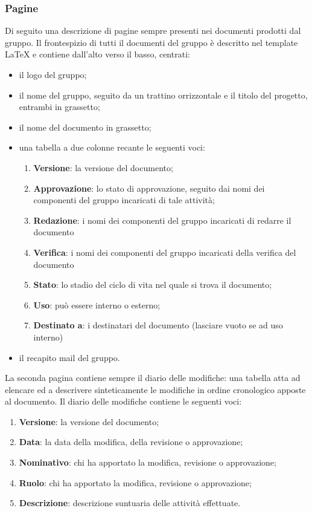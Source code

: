 	    \subsubsection{Pagine}
	    Di seguito una descrizione di pagine sempre presenti nei documenti prodotti dal gruppo.
	    Il frontespizio di tutti il documenti del gruppo è descritto nel template LaTeX e contiene dall'alto verso il basso, centrati:
	    \begin{itemize}
	        \item il logo del gruppo;
	        \item il nome del gruppo, seguito da un trattino orrizzontale e il titolo del progetto, entrambi in grassetto;
	        \item il nome del documento in grassetto;
	        \item una tabella a due colonne recante le seguenti voci:
	        \begin{enumerate}
	            \item \textbf{Versione}: la versione del documento;
	            \item \textbf{Approvazione}: lo stato di approvazione, seguito dai nomi dei componenti del gruppo incaricati di tale attività;
	            \item \textbf{Redazione}: i nomi dei componenti del gruppo incaricati di redarre il documento
	            \item \textbf{Verifica}: i nomi dei componenti del gruppo incaricati della verifica del documento
	            \item \textbf{Stato}: lo stadio del ciclo di vita nel quale si trova il documento;
	            \item \textbf{Uso}: può essere interno o esterno;
	            \item \textbf{Destinato a}: i destinatari del documento (lasciare vuoto se ad uso interno)
	        \end{enumerate}
	        \item il recapito mail del gruppo.
	    \end{itemize}
	    
	    La seconda pagina contiene sempre il diario delle modifiche: una tabella atta ad elencare ed a descrivere sinteticamente le modifiche in ordine cronologico apposte al documento.
	    Il diario delle modifiche contiene le seguenti voci:
	    \begin{enumerate}
	        \item \textbf{Versione}: la versione del documento;
	        \item \textbf{Data}: la data della modifica, della revisione o approvazione;
	        \item \textbf{Nominativo}: chi ha apportato la modifica, revisione o approvazione;
	        \item \textbf{Ruolo}: chi ha apportato la modifica, revisione o approvazione;
	        \item \textbf{Descrizione}: descrizione suntuaria delle attività effettuate.
	    \end{enumerate}
	    
